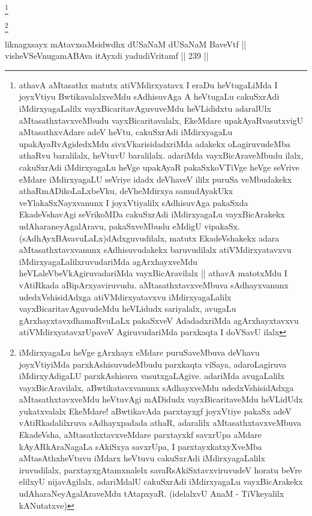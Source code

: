 \footnote{athavA aMtasathx matutx atiVMdirxyatavx I eraDu heVtugaLiMda I joyxVtiyu BwtikavalalxveMdu sAdhisuvAga A heVtugaLu cakuSxrAdi iMdirxyagaLalilx vayxBicaritavAguvuveMdu heVLididxtu adaralUlx aMtasathxtavxveMbudu vayxBicaritavalalx, EkeMdare upakAyaRvasutxvigU aMtasathxvAdare adeV heVtu, cakuSxrAdi iMdirxyagaLu upakAyaRvAgidedxMdu sivxVkarisidadxriMda adakekx oLagiruvudeMba athaRvu baralilalx, heVtuvU baralilalx. adariMda vayxBicAraveMbudu ilalx, cakuSxrAdi iMdirxyagaLu heVge upakAyaR pakaSxkoVTiVge heVge seVrive eMdare iMdirxyagaLU seVriye idadx deVhaveV ililx puruSa veMbudakekx athaRmADikoLaLxbeVku, deVheMdirxya samudAyakUkx veYlakaSxNayxvanunx I joyxVtiyalilx sAdhisuvAga pakaSxda EkadeVshavAgi seVrikoMDa cakuSxrAdi iMdirxyagaLu vayxBicArakekx udAharaneyAgalAravu, pakaSxveMbudu eMdigU vipakaSx. (sAdhAyxBAvavuLaLx)dAdxguvudilalx, matutx EkadeVshakekx adara aMtasathxtavxvanunx sAdhisuvudakekx baruvudilalx atiVMdirxyatavxvu iMdirxyagaLalilxruvudariMda agArxhayxveMdu heVLaleVbeVkAgiruvadariMda vayxBicAravilalx || athavA matotxMdu I vAtiRkada aBipArxyaviruvudu. aMtasathxtavxveMbuva sAdhayxvanunx udedxVshisidAdxga atiVMdirxyatavxvu iMdirxyagaLalilx vayxBicaritavAguvudeMdu heVLidudx sariyalalx, avugaLu gArxhayxtavxdhamaRvuLaLx pakaSxveV AdadadxriMda agArxhayxtavxvu atiVMdirxyatavxrUpaveV AgiruvudariMda parxkaqta I doVSavU ilalx}

\footnote{iMdirxyagaLu heVge gArxhayx eMdare puruSaveMbuva deVhavu joyxVtiyiMda parxkAshisuvudeMbudu parxkaqta viSaya, adaroLagiruva iMdirxyAdigaLU parxkAshisuva vasutxgaLAgive. adariMda avugaLalilx vayxBicAravilalx, aBwtikatavxvanunx sAdhayxveMdu udedxVshisidAdxga aMtasathxtavxveMdu heVtuvAgi mADidudx vayxBicaritaveMdu heVLidUdx yukatxvalalx EkeMdare! aBwtikavAda parxtayxgf joyxVtiye pakaSx adeV vAtiRkadalilxruva sAdhayxpadada athaR, adaralilx aMtasathxtavxveMbuva EkadeVsha, aMtasathxtavxveMdare parxtayxkf savxrUpa aMdare kAyARkAraNagaLa sAkiSxya savxrUpa, I parxtayxkatxyXveMba aMtasAthxheVtuvu iMdarx heVtuvu cakuSxrAdi iMdirxyagaLalilx iruvudilalx, parxtayxgAtamxnalelx savaRsAkiSxtavxviruvudeV horatu beVre elilxyU nijavAgilalx, adariMdalU cakuSxrAdi iMdirxyagaLu vayxBicArakekx udAharaNeyAgalAraveMdu tAtapxyaR. (idelalxvU AnaM - TiVkeyalilx kANutatxve)}


\begin{shl}
liknagxsayx mAtavxsaMsidwdhx dUSaNaM dUSaNaM BaveVtf || \\
visheVSeV\s nugamABAva itAyxdi yadudiVritamf ||  239 ||  
\end{shl}

